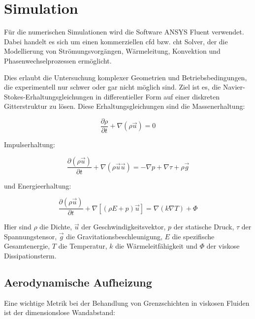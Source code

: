 \section{Simulation}

Für die numerischen Simulationen wird die Software ANSYS Fluent verwendet. Dabei handelt es sich um einen kommerziellen
\ac{cfd} bzw. \ac{cht} Solver, der die Modellierung von Strömungsvorgängen, Wärmeleitung, Konvektion und Phasenwechselprozessen ermöglicht.

Dies erlaubt die Untersuchung komplexer Geometrien und Betriebsbedingungen,
die experimentell nur schwer oder gar nicht möglich sind. Ziel ist es, die Navier-Stokes-Erhaltungsgleichungen in differentieller Form auf einer
diskreten Gitterstruktur zu lösen. Diese Erhaltungsgleichungen sind die Massenerhaltung:

\begin{equation}
  \label{eq:navier_massenerhaltung}
  \frac{\partial \rho}{\partial t} + \nabla \left( \rho \vec{u} \right) = 0
\end{equation}

Impulserhaltung:

\begin{equation}
  \label{eq:navier_impulserhaltung}
  \frac{\partial \left( \rho \vec{u} \right)}{\partial t} + \nabla \left( \rho \vec{u} \vec{u} \right) = -\nabla p + \nabla \tau + \rho \vec{g}
\end{equation}

und Energieerhaltung:

\begin{equation}
  \label{eq:navier_energieerhaltung}
  \frac{\partial \left(\rho \vec{u}\right)}{\partial t} + \nabla \left[\left(\rho E + p\right)\vec{u}\right] = \nabla \left(k \nabla T\right) + \Phi
\end{equation}

Hier sind $\rho$ die Dichte, $\vec{u}$ der Geschwindigkeitsvektor, $p$ der statische Druck, $\tau$ der Spannungstensor,
$\vec{g}$ die Gravitationsbeschleunigung, $E$ die spezifische Gesamtenergie, $T$ die Temperatur, $k$ die Wärmeleitfähigkeit
und $\Phi$ der viskose Dissipationsterm.

\subsection{Aerodynamische Aufheizung}

Eine wichtige Metrik bei der Behandlung von Grenzschichten in viskosen Fluiden ist der dimensionslose Wandabstand:


